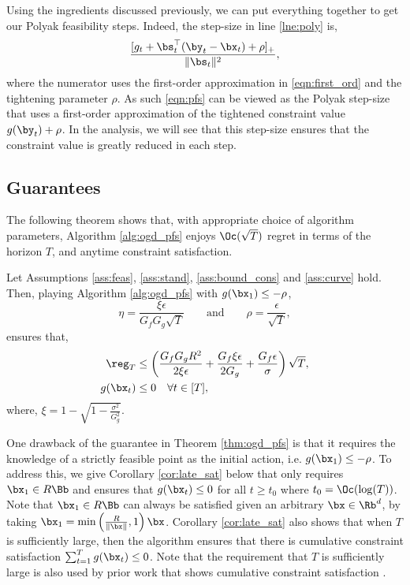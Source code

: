 Using the ingredients discussed previously, we can put everything together to get our Polyak feasibility steps.
Indeed, the step-size in line \ref{lne:poly} is,
\begin{equation}
    \label{eqn:pfs}
    \frac{[g_t + \bs_t^\top (\by_{t} - \bx_t) + \rho]_+}{\| \bs_t \|^2},
\end{equation}
where the numerator uses the first-order approximation in \eqref{eqn:first_ord} and the tightening parameter $\rho$. 
As such \eqref{eqn:pfs} can be viewed as the Polyak step-size that uses a first-order approximation of the tightened constraint value $g(\by_t) + \rho$.
In the analysis, we will see that this step-size ensures that the constraint value is greatly reduced in each step.

\subsection{Guarantees}
\label{sec:guar}

The following theorem shows that, with appropriate choice of algorithm parameters, Algorithm \ref{alg:ogd_pfs} enjoys $\Oc(\sqrt{T})$ regret in terms of the horizon $T$, and anytime constraint satisfaction.


\begin{theorem}
    \label{thm:ogd_pfs}
    Let Assumptions \ref{ass:feas}, \ref{ass:stand}, \ref{ass:bound_cons} and \ref{ass:curve} hold.
    Then, playing Algorithm \ref{alg:ogd_pfs} with $g(\bx_1) \leq -\rho$,
    \begin{equation*}
        \eta = \frac{\xi \epsilon}{G_f G_g \sqrt{T}} \qquad \text{and} \qquad \rho = \frac{\epsilon}{\sqrt{T}},
    \end{equation*}
    ensures that,
    \begin{align*}
        \reg_T & \leq \left(\frac{G_f G_g R^2}{2 \xi \epsilon} + \frac{G_f \xi \epsilon}{2 G_g} + \frac{G_f \epsilon}{\sigma} \right) \sqrt{T},\\
        g(\bx_t) & \leq 0 \quad \forall t \in [T],
    \end{align*}
    where, $\xi = 1 - \sqrt{1 - \frac{\sigma^2}{G_g^2}}$.
\end{theorem}

One drawback of the guarantee in Theorem \ref{thm:ogd_pfs} is that it requires the knowledge of a strictly feasible point as the initial action, i.e. $g(\bx_1) \leq - \rho$.
To address this, we give Corollary \ref{cor:late_sat} below that only requires $\bx_1 \in R \Bb$ and ensures that $g(\bx_t) \leq 0$ for all $t \geq t_0$ where $t_0 = \Oc(\log(T))$.
Note that $\bx_1 \in R \Bb$ can always be satisfied given an arbitrary $\bx \in \Rb^d$, by taking $\bx_1 = \min\left( \frac{R}{\| \bx \|}, 1 \right) \bx$.
Corollary \ref{cor:late_sat} also shows that when $T$ is sufficiently large, then the algorithm ensures that there is cumulative constraint satisfaction $\sum_{t=1}^{T} g(\bx_t) \leq 0$.
Note that the requirement that $T$ is sufficiently large is also used by prior work that shows cumulative constraint satisfaction \cite{mahdavi2012trading,jenatton2016adaptive}.

